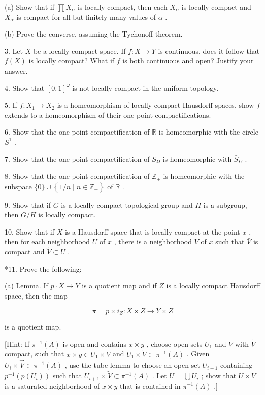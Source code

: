 \documentclass[10pt]{article}
\begin{document}
(a) Show that if \(\prod {X}_{\alpha }\) is locally compact, then each \({X}_{\alpha }\) is locally compact and \({X}_{\alpha }\) is compact for all but finitely many values of \(\alpha\) .

(b) Prove the converse, assuming the Tychonoff theorem.

3. Let \(X\) be a locally compact space. If \(f : X \rightarrow  Y\) is continuous, does it follow that \(f\left( X\right)\) is locally compact? What if \(f\) is both continuous and open? Justify your answer.

4. Show that \({\left\lbrack  0,1\right\rbrack  }^{\omega }\) is not locally compact in the uniform topology.

5. If \(f : {X}_{1} \rightarrow  {X}_{2}\) is a homeomorphism of locally compact Hausdorff spaces, show \(f\) extends to a homeomorphism of their one-point compactifications.

6. Show that the one-point compactification of \(\mathbb{R}\) is homeomorphic with the circle \({S}^{1}\) .

7. Show that the one-point compactification of \({S}_{\Omega }\) is homeomorphic with \({\bar{S}}_{\Omega }\) .

8. Show that the one-point compactification of \({\mathbb{Z}}_{ + }\) is homeomorphic with the subspace \(\{ 0\}  \cup  \left\{  {1/n \mid  n \in  {\mathbb{Z}}_{ + }}\right\}\) of \(\mathbb{R}\) .

9. Show that if \(G\) is a locally compact topological group and \(H\) is a subgroup, then \(G/H\) is locally compact.

10. Show that if \(X\) is a Hausdorff space that is locally compact at the point \(x\) , then for each neighborhood \(U\) of \(x\) , there is a neighborhood \(V\) of \(x\) such that \(\bar{V}\) is compact and \(\widetilde{V} \subset  U\) .

*11. Prove the following:

(a) Lemma. If \(p \cdot  X \rightarrow  Y\) is a quotient map and if \(Z\) is a locally compact Hausdorff space, then the map

\[
\pi  = p \times  {i}_{Z} : X \times  Z \rightarrow  Y \times  Z
\]

is a quotient map.

[Hint: If \({\pi }^{-1}\left( A\right)\) is open and contains \(x \times  y\) , choose open sets \({U}_{1}\) and \(V\) with \(\widetilde{V}\) compact, such that \(x \times  y \in  {U}_{1} \times  V\) and \({U}_{1} \times  \widetilde{V} \subset  {\pi }^{-1}\left( A\right)\) . Given \({U}_{i} \times  \overrightarrow{V} \subset  {\pi }^{-1}\left( A\right)\) , use the tube lemma to choose an open set \({U}_{i + 1}\) containing \({p}^{-1}\left( {p\left( {U}_{i}\right) }\right)\) such that \({U}_{i + 1} \times  \widetilde{V} \subset  {\pi }^{-1}\left( A\right)\) . Let \(U = \bigcup {U}_{i}\) ; show that \(U \times  V\) is a saturated neighborhood of \(x \times  y\) that is contained in \({\pi }^{-1}\left( A\right)\) .]
\end{document}
